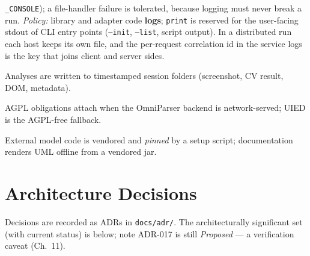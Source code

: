\documentclass[11pt,a4paper]{report}
\newcommand{\code}[1]{\texttt{#1}}
\begin{document}
\begin{description}[leftmargin=0pt,style=nextline]
    \code{\_CONSOLE}); a file-handler failure is tolerated, because logging must
    never break a run. \emph{Policy:} library and adapter code \textbf{logs};
    \code{print} is reserved for the user-facing stdout of CLI entry points
    (\code{--init}, \code{--list}, script output). In a distributed run each host
    keeps its own file, and the per-request correlation id in the service logs is
    the key that joins client and server sides.
  \item[Persistence] Analyses are written to timestamped session folders
    (screenshot, CV result, DOM, metadata).
  \item[Licensing] AGPL obligations attach when the OmniParser backend is
    network-served; UIED is the AGPL-free fallback.
  \item[Offline operation] External model code is vendored and \emph{pinned} by a
    setup script; documentation renders UML offline from a vendored jar.
\end{description}

\chapter{Architecture Decisions}
Decisions are recorded as ADRs in \code{docs/adr/}. The architecturally significant
set (with current status) is below; note ADR-017 is still \emph{Proposed} --- a
verification caveat (Ch.~11).
\end{document}
